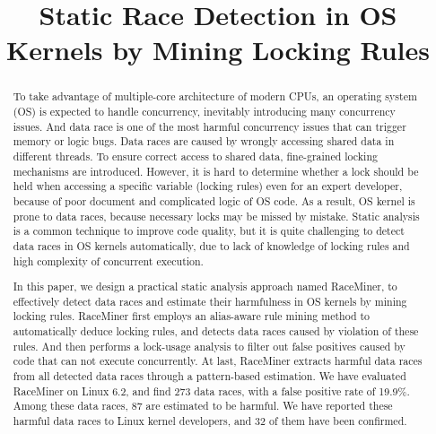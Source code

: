\documentclass[pageno]{jpaper}
\newcommand{\sys}{\mbox{RaceMiner}\xspace}
\begin{document}
\title{
Static Race Detection in OS Kernels by Mining Locking Rules}

\date{}
\maketitle

\thispagestyle{empty}

\begin{abstract}
	
To take advantage of multiple-core architecture of modern CPUs, an operating 
system (OS) is expected to handle concurrency, inevitably introducing many 
concurrency issues. And data race is one of the most harmful concurrency issues 
that can trigger memory or logic bugs. Data races are caused by wrongly 
accessing shared data in different threads. To ensure correct access to shared 
data, fine-grained locking mechanisms are introduced. However, it is hard to 
determine whether a lock should be held when accessing a specific variable 
(locking rules) even for an expert developer, because of poor document and 
complicated logic of OS code. As a result, OS kernel is prone to data races, 
because necessary locks may be missed by mistake. Static analysis is a common 
technique to improve code quality, but it is quite challenging to detect data 
races in OS kernels automatically, due to lack of knowledge of locking rules 
and high complexity of concurrent execution.

In this paper, we design a practical static analysis approach named \sys, to 
effectively detect data races and estimate their harmfulness in OS kernels by 
mining locking rules. \sys first employs an alias-aware rule mining method to 
automatically deduce locking rules, and detects data races caused by violation 
of these rules. And then performs a lock-usage analysis to filter out false 
positives caused by code that can not execute concurrently. At last, \sys 
extracts harmful data races from all detected data races through a 
pattern-based estimation. We have evaluated \sys on Linux 6.2, and find 273 
data races, with a false positive rate of 19.9\%. Among these data races, 87 
are estimated to be harmful. We have reported these harmful data races to Linux 
kernel developers, and 32 of them have been confirmed.

\end{abstract}










\footnotesize


\end{document}
